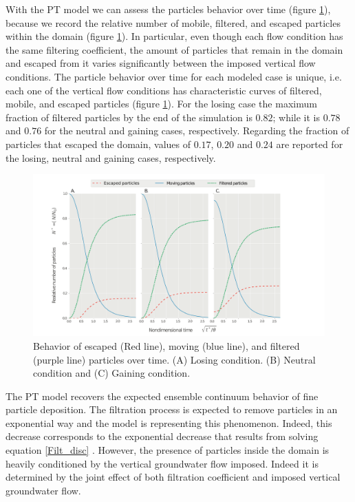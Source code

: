 \documentclass[draft,linenumbers]{agujournal2018}
\begin{document}
With the PT model we can  assess the particles behavior over time (figure \ref{Pvst}), because we record the relative number of mobile, filtered, and escaped particles within the domain (figure \ref{Pvst}). In particular, even though each flow condition has the same filtering coefficient, the amount of particles that remain in the domain and escaped from it varies significantly between the imposed vertical flow conditions. The particle behavior over time for each modeled case is unique, i.e. each one of the vertical flow conditions has characteristic curves of filtered, mobile, and escaped particles (figure \ref{Pvst}). For the losing case the maximum fraction of filtered particles by the end of the simulation is $0.82$; while it is $0.78$ and $0.76$ for the neutral and gaining cases, respectively. Regarding the fraction of particles that escaped the domain, values of $0.17$, $0.20$ and $0.24$ are reported for the losing, neutral and gaining cases, respectively.

\begin{figure}
\centering
\includegraphics[trim=0.2cm 0.2cm 0.2cm 0.2cm, width=60pc]
{190305_Pvst.pdf}
\caption{Behavior of escaped (Red line), moving (blue line), and filtered (purple line) particles over time. (A) Losing condition. (B) Neutral condition and (C) Gaining condition.}
\label{Pvst}
\end{figure}

The PT model recovers the expected ensemble continuum behavior of fine particle deposition. The filtration process is expected to remove particles in an exponential way and the model is representing this phenomenon. Indeed, this decrease corresponds to the exponential decrease that results from solving equation \ref{Filt_disc} \citep{Li2017}. However, the presence of particles inside the domain is heavily conditioned by the vertical groundwater flow imposed. Indeed it is determined by the joint effect of both filtration coefficient and imposed vertical groundwater flow.  
\end{document}
